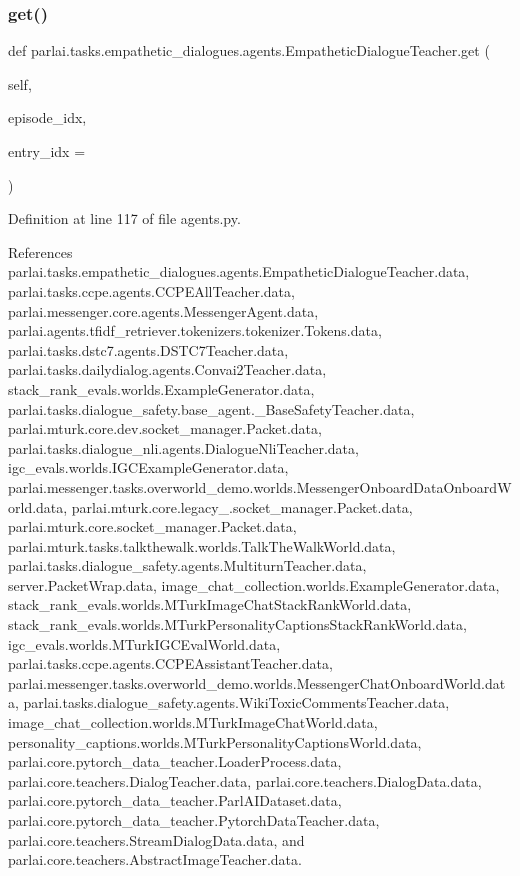 \subsubsection{\texorpdfstring{get()}{get()}}
{\footnotesize\ttfamily def parlai.\+tasks.\+empathetic\+\_\+dialogues.\+agents.\+Empathetic\+Dialogue\+Teacher.\+get (\begin{DoxyParamCaption}\item[{}]{self,  }\item[{}]{episode\+\_\+idx,  }\item[{}]{entry\+\_\+idx = {} }\end{DoxyParamCaption})}



Definition at line 117 of file agents.\+py.



References parlai.\+tasks.\+empathetic\+\_\+dialogues.\+agents.\+Empathetic\+Dialogue\+Teacher.\+data, parlai.\+tasks.\+ccpe.\+agents.\+C\+C\+P\+E\+All\+Teacher.\+data, parlai.\+messenger.\+core.\+agents.\+Messenger\+Agent.\+data, parlai.\+agents.\+tfidf\+\_\+retriever.\+tokenizers.\+tokenizer.\+Tokens.\+data, parlai.\+tasks.\+dstc7.\+agents.\+D\+S\+T\+C7\+Teacher.\+data, parlai.\+tasks.\+dailydialog.\+agents.\+Convai2\+Teacher.\+data, stack\+\_\+rank\+\_\+evals.\+worlds.\+Example\+Generator.\+data, parlai.\+tasks.\+dialogue\+\_\+safety.\+base\+\_\+agent.\+\_\+\+Base\+Safety\+Teacher.\+data, parlai.\+mturk.\+core.\+dev.\+socket\+\_\+manager.\+Packet.\+data, parlai.\+tasks.\+dialogue\+\_\+nli.\+agents.\+Dialogue\+Nli\+Teacher.\+data, igc\+\_\+evals.\+worlds.\+I\+G\+C\+Example\+Generator.\+data, parlai.\+messenger.\+tasks.\+overworld\+\_\+demo.\+worlds.\+Messenger\+Onboard\+Data\+Onboard\+World.\+data, parlai.\+mturk.\+core.\+legacy\+\_.\+socket\+\_\+manager.\+Packet.\+data, parlai.\+mturk.\+core.\+socket\+\_\+manager.\+Packet.\+data, parlai.\+mturk.\+tasks.\+talkthewalk.\+worlds.\+Talk\+The\+Walk\+World.\+data, parlai.\+tasks.\+dialogue\+\_\+safety.\+agents.\+Multiturn\+Teacher.\+data, server.\+Packet\+Wrap.\+data, image\+\_\+chat\+\_\+collection.\+worlds.\+Example\+Generator.\+data, stack\+\_\+rank\+\_\+evals.\+worlds.\+M\+Turk\+Image\+Chat\+Stack\+Rank\+World.\+data, stack\+\_\+rank\+\_\+evals.\+worlds.\+M\+Turk\+Personality\+Captions\+Stack\+Rank\+World.\+data, igc\+\_\+evals.\+worlds.\+M\+Turk\+I\+G\+C\+Eval\+World.\+data, parlai.\+tasks.\+ccpe.\+agents.\+C\+C\+P\+E\+Assistant\+Teacher.\+data, parlai.\+messenger.\+tasks.\+overworld\+\_\+demo.\+worlds.\+Messenger\+Chat\+Onboard\+World.\+data, parlai.\+tasks.\+dialogue\+\_\+safety.\+agents.\+Wiki\+Toxic\+Comments\+Teacher.\+data, image\+\_\+chat\+\_\+collection.\+worlds.\+M\+Turk\+Image\+Chat\+World.\+data, personality\+\_\+captions.\+worlds.\+M\+Turk\+Personality\+Captions\+World.\+data, parlai.\+core.\+pytorch\+\_\+data\+\_\+teacher.\+Loader\+Process.\+data, parlai.\+core.\+teachers.\+Dialog\+Teacher.\+data, parlai.\+core.\+teachers.\+Dialog\+Data.\+data, parlai.\+core.\+pytorch\+\_\+data\+\_\+teacher.\+Parl\+A\+I\+Dataset.\+data, parlai.\+core.\+pytorch\+\_\+data\+\_\+teacher.\+Pytorch\+Data\+Teacher.\+data, parlai.\+core.\+teachers.\+Stream\+Dialog\+Data.\+data, and parlai.\+core.\+teachers.\+Abstract\+Image\+Teacher.\+data.



